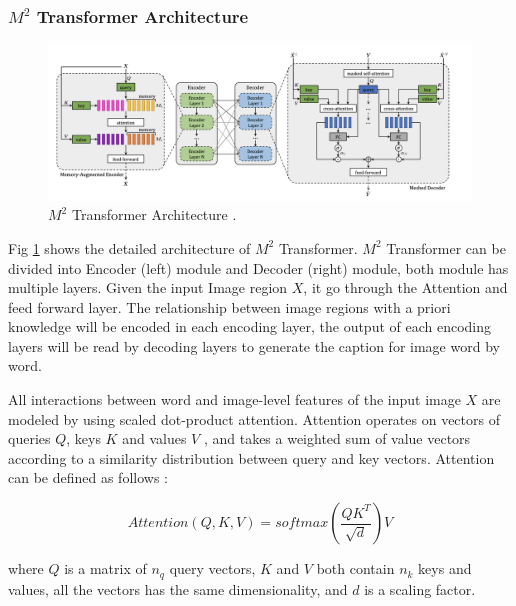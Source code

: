 \documentclass[
]{krantz}
\begin{document}
\hypertarget{m2-transformer-architecture}{%
\subsubsection{\texorpdfstring{\(M^2\) Transformer Architecture}{M\^{}2 Transformer Architecture}}\label{m2-transformer-architecture}}



\begin{figure}

{\centering \includegraphics[width=1\linewidth]{figures/02-01/2.1 m2} 

}

\caption{\(M^2\) Transformer Architecture \citep{cornia2020m2}.}\label{fig:m2arc2}
\end{figure}

Fig \ref{fig:m2arc2} shows the detailed architecture of \(M^2\) Transformer. \(M^2\) Transformer can be divided into Encoder (left) module and Decoder (right) module, both module has multiple layers. Given the input Image region \(X\), it go through the Attention and feed forward layer. The relationship between image regions with a priori knowledge will be encoded in each encoding layer, the output of each encoding layers will be read by decoding layers to generate the caption for image word by word.\citep{cornia2020m2}

All interactions between word and image-level features of the input image \(X\) are modeled by using scaled dot-product attention. Attention operates on vectors of queries \(Q\), keys \(K\) and values \(V\) , and takes a weighted sum of value vectors according to a similarity distribution between query and key vectors.
Attention can be defined as follows \citep{cornia2020m2}:

\begin{equation}
Attention(Q, K, V) = softmax(\frac{QK^T}{\sqrt{d}}) V
\label{eq:binom}
\end{equation}

where \(Q\) is a matrix of \(n_q\) query vectors, \(K\) and \(V\) both contain \(n_k\) keys and values, all the vectors has the same dimensionality, and \(d\) is a scaling factor.
\end{document}
